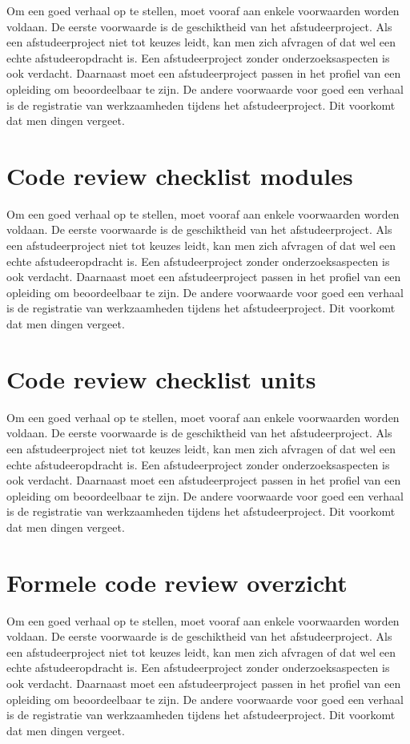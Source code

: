 			Om een goed verhaal op te stellen, moet vooraf aan enkele voorwaarden
			worden voldaan. De eerste voorwaarde is de geschiktheid van het
			afstudeerproject. Als een afstudeerproject niet tot keuzes leidt, kan
			men zich afvragen of dat wel een echte afstudeeropdracht is. Een
			afstudeerproject zonder onderzoeksaspecten is ook verdacht. Daarnaast
			moet een afstudeerproject passen in het profiel van een opleiding om
			beoordeelbaar te zijn. De andere voorwaarde voor goed een verhaal is
			de registratie van werkzaamheden tijdens het afstudeerproject. Dit
			voorkomt dat men dingen vergeet.
			\section{Code review checklist modules
			}
			
			Om een goed verhaal op te stellen, moet vooraf aan enkele voorwaarden
			worden voldaan. De eerste voorwaarde is de geschiktheid van het
			afstudeerproject. Als een afstudeerproject niet tot keuzes leidt, kan
			men zich afvragen of dat wel een echte afstudeeropdracht is. Een
			afstudeerproject zonder onderzoeksaspecten is ook verdacht. Daarnaast
			moet een afstudeerproject passen in het profiel van een opleiding om
			beoordeelbaar te zijn. De andere voorwaarde voor goed een verhaal is
			de registratie van werkzaamheden tijdens het afstudeerproject. Dit
			voorkomt dat men dingen vergeet.
			\section{Code review checklist units
			}
			
			Om een goed verhaal op te stellen, moet vooraf aan enkele voorwaarden
			worden voldaan. De eerste voorwaarde is de geschiktheid van het
			afstudeerproject. Als een afstudeerproject niet tot keuzes leidt, kan
			men zich afvragen of dat wel een echte afstudeeropdracht is. Een
			afstudeerproject zonder onderzoeksaspecten is ook verdacht. Daarnaast
			moet een afstudeerproject passen in het profiel van een opleiding om
			beoordeelbaar te zijn. De andere voorwaarde voor goed een verhaal is
			de registratie van werkzaamheden tijdens het afstudeerproject. Dit
			voorkomt dat men dingen vergeet.
			\section{Formele code review overzicht}
			
			Om een goed verhaal op te stellen, moet vooraf aan enkele voorwaarden
			worden voldaan. De eerste voorwaarde is de geschiktheid van het
			afstudeerproject. Als een afstudeerproject niet tot keuzes leidt, kan
			men zich afvragen of dat wel een echte afstudeeropdracht is. Een
			afstudeerproject zonder onderzoeksaspecten is ook verdacht. Daarnaast
			moet een afstudeerproject passen in het profiel van een opleiding om
			beoordeelbaar te zijn. De andere voorwaarde voor goed een verhaal is
			de registratie van werkzaamheden tijdens het afstudeerproject. Dit
			voorkomt dat men dingen vergeet.
